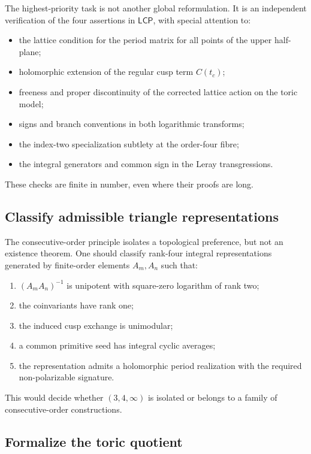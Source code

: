 \documentclass[11pt,reqno]{amsart}
\numberwithin{equation}{section}
\newcommand{\LCP}{\mathsf{LCP}}
\theoremstyle{definition}
\begin{document}
The highest-priority task is not another global reformulation. It is an independent verification of the four assertions in $\LCP$, with special attention to:
\begin{itemize}
\item the lattice condition for the period matrix for all points of the upper half-plane;
\item holomorphic extension of the regular cusp term $C(t_c)$;
\item freeness and proper discontinuity of the corrected lattice action on the toric model;
\item signs and branch conventions in both logarithmic transforms;
\item the index-two specialization subtlety at the order-four fibre;
\item the integral generators and common sign in the Leray transgressions.
\end{itemize}
These checks are finite in number, even where their proofs are long.

\subsection{Classify admissible triangle representations}

The consecutive-order principle isolates a topological preference, but not an existence theorem. One should classify rank-four integral representations generated by finite-order elements $A_m,A_n$ such that:
\begin{enumerate}
\item $(A_mA_n)^{-1}$ is unipotent with square-zero logarithm of rank two;
\item the coinvariants have rank one;
\item the induced cusp exchange is unimodular;
\item a common primitive seed has integral cyclic averages;
\item the representation admits a holomorphic period realization with the required non-polarizable signature.
\end{enumerate}
This would decide whether $(3,4,\infty)$ is isolated or belongs to a family of consecutive-order constructions.

\subsection{Formalize the toric quotient}
\end{document}
